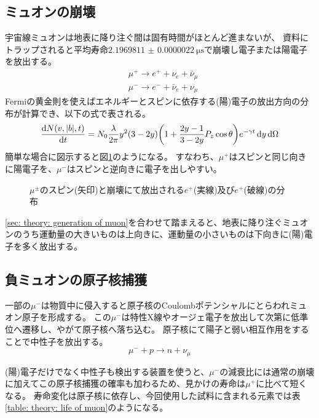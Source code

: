 \documentclass[dvipdfmx]{jsarticle}
\begin{document}
\subsection{ミュオンの崩壊}
\label{sec: theory: decay of muon}

宇宙線ミュオンは地表に降り注ぐ間は固有時間がほとんど進まないが、
資料にトラップされると平均寿命$\SI{2.1969811(22)}{\micro\second}$で崩壊し電子または陽電子を放出する。
\begin{align*}
    &\mu^+\to e^++\nu_e+\bar{\nu}_\mu
    \\
    &\mu^-\to e^-+\bar{\nu}_e+\nu_\mu
\end{align*}
Fermiの黄金則を使えばエネルギーとスピンに依存する(陽)電子の放出方向の分布が計算でき、以下の式で表される。
\begin{equation*}
    \dv{N(v,|b|,t)}{t}
    =
    N_0\frac{\lambda}{2\pi}y^2(3-2y)
    \qty(
        1+\frac{2y-1}{3-2y}P_z\cos\theta
    )
    e^{-\gamma t}\dd{y}\dd{\Omega}
\end{equation*}
簡単な場合に図示すると図\ref{fig: muon decay distrib.}のようになる。
すなわち、$\mu^+$はスピンと同じ向きに陽電子を、$\mu^-$はスピンと逆向きに電子を出しやすい。

\begin{figure}
    \centering
    
    \caption{$\mu^\pm$のスピン(矢印)と崩壊にて放出される$e^+$(実線)及び$e^+$(破線)の分布}
    \label{fig: muon decay distrib.}
\end{figure}

\ref{sec: theory: generation of muon}を合わせて踏まえると、地表に降り注ぐミュオンのうち運動量の大きいものは上向きに、運動量の小さいものは下向きに(陽)電子を多く放出する。


\subsection{負ミュオンの原子核捕獲}
\label{sec: theory: negative muon capture}

一部の$\mu^-$は物質中に侵入すると原子核のCoulombポテンシャルにとらわれミュオン原子を形成する。
この$\mu^-$は特性X線やオージェ電子を放出して次第に低準位へ遷移し、やがて原子核へ落ち込む。
原子核にて陽子と弱い相互作用をすることで中性子を放出する。
\begin{equation*}
    \mu^-+p\to n+\nu_\mu
\end{equation*}

(陽)電子だけでなく中性子も検出する装置を使うと、$\mu^-$の減衰比には通常の崩壊に加えてこの原子核捕獲の確率も加わるため、見かけの寿命は$\mu^+$に比べて短くなる。
寿命変化は原子核に依存し、今回使用した試料に含まれる元素では表\ref{table: theory: life of muon}のようになる\cite{Ito Kaji Tabata Yoshiwara}。
\end{document}
